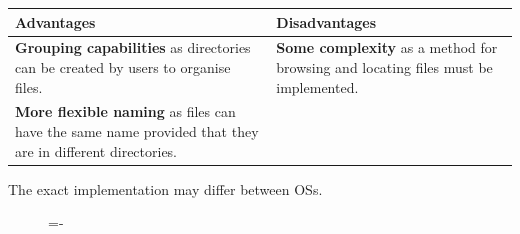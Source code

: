 \documentclass[a4paper]{systems-software}
\begin{document}
\begin{longtabu} to \textwidth {| X[1,l] | X[1,l] |}
    \hline
    \textbf{Advantages} & \textbf{Disadvantages}
	\\ \hline
	\textbf{Grouping capabilities} as directories can be created by users to organise files. &
	\textbf{Some complexity} as a method for browsing and locating files must be implemented.
	\\ \hline
	\textbf{More flexible naming} as files can have the same name provided that they are in different directories. &
	\\ \hline
\end{longtabu}

The exact implementation may differ between OSs.

\begin{figure}[H]
  \lineskip=-\fboxrule
\end{figure}
\end{document}
